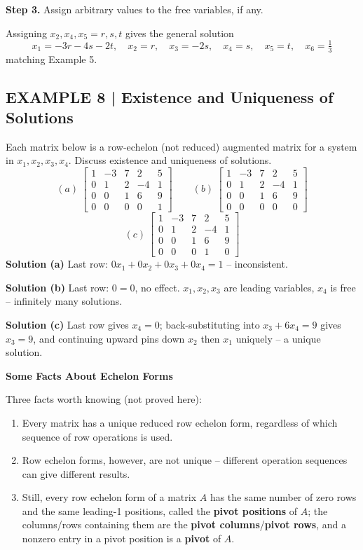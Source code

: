 \documentclass{article}
\newcommand{\redheading}[1]{{\vspace{2mm}\noindent\Large\bfseries\color{red!55!black} #1\par}\vspace{2mm}}
\theoremstyle{mystyle}
\begin{document}
\noindent\textbf{Step 3.} Assign arbitrary values to the free variables, if any.

Assigning $x_2,x_4,x_5=r,s,t$ gives the general solution
\[
x_1=-3r-4s-2t,\quad x_2=r,\quad x_3=-2s,\quad x_4=s,\quad x_5=t,\quad x_6=\tfrac13
\]
matching Example 5.

\subsection*{EXAMPLE 8 | Existence and Uniqueness of Solutions}
Each matrix below is a row-echelon (not reduced) augmented matrix for a system in $x_1,x_2,x_3,x_4$. Discuss existence and uniqueness of solutions.
\[
(a)\ \begin{bmatrix}1&-3&7&2&5\\0&1&2&-4&1\\0&0&1&6&9\\0&0&0&0&1\end{bmatrix}\qquad
(b)\ \begin{bmatrix}1&-3&7&2&5\\0&1&2&-4&1\\0&0&1&6&9\\0&0&0&0&0\end{bmatrix}
\]
\[
(c)\ \begin{bmatrix}1&-3&7&2&5\\0&1&2&-4&1\\0&0&1&6&9\\0&0&0&1&0\end{bmatrix}
\]
\textbf{Solution (a)} Last row: $0x_1+0x_2+0x_3+0x_4=1$ -- inconsistent.

\textbf{Solution (b)} Last row: $0=0$, no effect. $x_1,x_2,x_3$ are leading variables, $x_4$ is free -- infinitely many solutions.

\textbf{Solution (c)} Last row gives $x_4=0$; back-substituting into $x_3+6x_4=9$ gives $x_3=9$, and continuing upward pins down $x_2$ then $x_1$ uniquely -- a unique solution.

\redheading{Some Facts About Echelon Forms}

Three facts worth knowing (not proved here):
\begin{enumerate}
    \item Every matrix has a unique reduced row echelon form, regardless of which sequence of row operations is used.
    \item Row echelon forms, however, are not unique -- different operation sequences can give different results.
    \item Still, every row echelon form of a matrix $A$ has the same number of zero rows and the same leading-1 positions, called the \textbf{pivot positions} of $A$; the columns/rows containing them are the \textbf{pivot columns}/\textbf{pivot rows}, and a nonzero entry in a pivot position is a \textbf{pivot} of $A$.
\end{enumerate}
\end{document}
